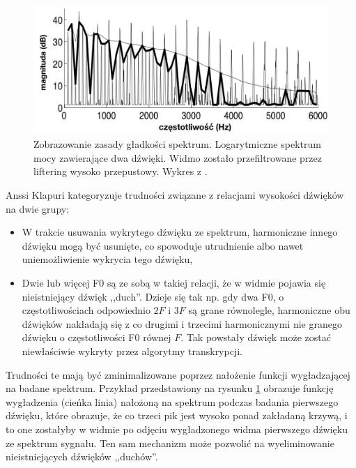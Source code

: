 \documentclass[12pt,a4paper,twoside]{mwart}
\begin{document}
\begin{figure}[ht]
  \begin{center}
    \includegraphics[scale=0.38]{images/spectral_smoothnes_kapuri.jpg}
    \caption{Zobrazowanie zasady gładkości spektrum. Logarytmiczne spektrum mocy zawierające dwa dźwięki. Widmo zostało przefiltrowane przez liftering wysoko przepustowy. Wykres z 
    \cite[3383]{Transcription:Klapuri:MultipitchEstimationAndSeparation}.
    }
    \label{fig:specSmooth:kapuri}
  \end{center}
\end{figure}

Anssi Klapuri kategoryzuje trudności związane z relacjami wysokości dźwięków na dwie grupy:
\begin{itemize}
\item W trakcie usuwania wykrytego dźwięku ze spektrum, harmoniczne innego dźwięku mogą być usunięte, co spowoduje utrudnienie albo nawet uniemożliwienie wykrycia tego dźwięku,
\item Dwie lub więcej F0 są ze sobą w takiej relacji, że w widmie pojawia się nieistniejący dźwięk ,,duch''. Dzieje się tak np. gdy dwa F0, o częstotliwościach odpowiednio $2F$ i $3F$ są grane równolegle, harmoniczne obu dźwięków nakładają się z co drugimi i trzecimi harmonicznymi nie granego dźwięku o częstotliwości F0 równej $F$. Tak powstały dźwięk może zostać niewłaściwie wykryty przez algorytmy transkrypcji.
\end{itemize}
Trudności te mają być zminimalizowane poprzez nałożenie funkcji wygładzającej na badane spektrum. Przykład przedstawiony na rysunku \ref{fig:specSmooth:kapuri} obrazuje funkcję wygładzenia (cieńka linia) nałożoną na spektrum podczas badania pierwszego dźwięku, które obrazuje, że co trzeci pik jest wysoko ponad zakładaną krzywą, i to one zostałyby w widmie po odjęciu wygładzonego widma pierwszego dźwięku ze spektrum sygnału. Ten sam mechanizm może pozwolić na wyeliminowanie nieistniejących dźwięków ,,duchów''.
\end{document}
